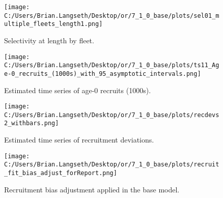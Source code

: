 \documentclass[11pt,
  english,
  a4paper,
]{article}
\begin{document}
\tagmcend\tagstructend


\begin{figure}
\centering
\texttt{[image: C:/Users/Brian.Langseth/Desktop/or/7\_1\_0\_base/plots/sel01\_multiple\_fleets\_length1.png]}
\caption{Selectivity at length by fleet.\label{fig:selex}}
\end{figure}

\tagmcend\tagstructend


\begin{figure}
\centering
\texttt{[image: C:/Users/Brian.Langseth/Desktop/or/7\_1\_0\_base/plots/ts11\_Age-0\_recruits\_(1000s)\_with\_95\_asymptotic\_intervals.png]}
\caption{Estimated time series of age-0 recruits (1000s).\label{fig:recruits}}
\end{figure}

\tagmcend\tagstructend


\begin{figure}
\centering
\texttt{[image: C:/Users/Brian.Langseth/Desktop/or/7\_1\_0\_base/plots/recdevs2\_withbars.png]}
\caption{Estimated time series of recruitment deviations.\label{fig:rec-devs}}
\end{figure}

\tagmcend\tagstructend


\begin{figure}
\centering
\texttt{[image: C:/Users/Brian.Langseth/Desktop/or/7\_1\_0\_base/plots/recruit\_fit\_bias\_adjust\_forReport.png]}
\caption{Recruitment bias adjustment applied in the base model.\label{fig:bias-adj}}
\end{figure}

\tagmcend\tagstructend

\end{document}
